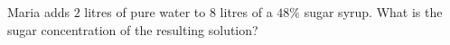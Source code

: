 Maria adds $2$ litres of pure water to $8$ litres of a $48\%$ sugar syrup. What is the sugar concentration of the resulting solution?

